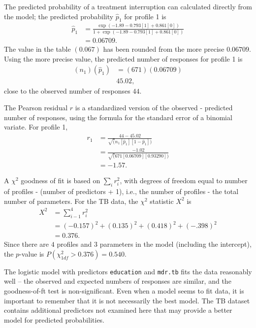 The predicted probability of a treatment interruption can calculated directly from the model; the predicted probability $\hat{p}_1$ for profile 1 is
\begin{align*}
     \hat{p}_1 &=   \frac{\exp(-1.89 - 0.793[1] + 0.861[0])}
       {1 + \exp(-1.89 - 0.793[1] + 0.861[0])} \\
       &= 0.06709.
\end{align*}
The value in the table $(0.067)$ has been rounded from the more precise $0.06709$.  Using the more precise value, the predicted number of responses for profile 1 is
\begin{align*}
    (n_1)(\hat{p}_1) &= (671)(0.06709) \\
    & 45.02,
\end{align*}
close to the observed number of responses $44$.

The Pearson residual $r$ is a standardized version of the observed - predicted number of responses, using the formula for the standard error of a binomial variate.  For profile 1,
\begin{align*}
   r_1 &=  \frac{44 - 45.02}{\sqrt(n_1[\hat{p}_1][1 - \hat{p}_1])} \\
       &= \frac{-1.02}{\sqrt(671[0.06709][0.93290])} \\
       &= -1.57.
\end{align*}

 A $\chi^2$ goodness of fit is based on $\sum_i r_i^2$, with degrees of freedom equal to number of profiles - (number of predictors + 1), i.e., the number of profiles - the total number of parameters.  For the TB data, the $\chi^2$ statistic $X^2$ is
\begin{align*}
   X^2 &= \sum_{i - 1}^4 r_i^2 \\
       &= (-0.157)^2 + (0.135)^2 + (0.418)^2 + (-.398)^2 \\
       &= 0.376.
\end{align*}
Since there are $4$ profiles and $3$ parameters in the model (including the intercept), the $p$-value is $P(\chi^2_{1df} > 0.376) = 0.540$.

The logistic model with predictors \texttt{education} and \texttt{mdr.tb}  fits the data reasonably well -- the observed and expected numbers of responses are similar, and the goodness-of-ft test is non-significant.  Even when a model seems to fit data, it is important to remember that it is not necessarily the best model. The TB dataset contains additional predictors not examined here that may provide a better model for predicted probabilities.


